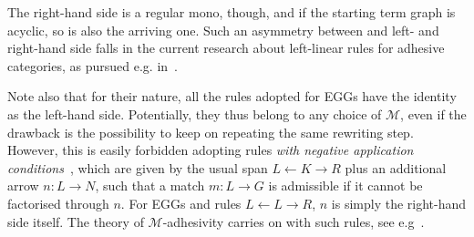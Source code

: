 \documentclass[a4paper,UKenglish,cleveref,pdftex,thm-restate,numberwithinsect]{lipics-v2021}
\begin{document}
\begin{minipage}[r]{.60\linewidth}
{
}
\end{minipage}

\vspace{.1cm}
\noindent
The right-hand side is a regular mono, though, and if the starting term graph is acyclic, so is also the arriving one.
Such an asymmetry between and left- and right-hand side falls in the current research about left-linear rules for 
adhesive categories, as pursued e.g. in~\cite{BaldanC0G24}.

Note also that for their nature, all the rules adopted for EGGs have the identity as the left-hand side. 
Potentially, they thus belong to any choice of $\mathcal{M}$, even if the drawback is the 
possibility to keep on repeating the same rewriting step.
However, this is easily forbidden adopting rules \emph{with negative application conditions}~\cite{xxx}, which are given by the usual span 
$L \leftarrow K \rightarrow R$ plus an additional arrow $n: L\rightarrow N$, such that a match $m: L \to G$ is admissible if it cannot
be factorised through $n$. For EGGs and rules $L \leftarrow L \rightarrow R$, $n$ is simply the right-hand side itself.
%
The theory of $\mathcal{M}$-adhesivity carries on with such rules, see e.g~\cite{xxx}.
\end{document}
